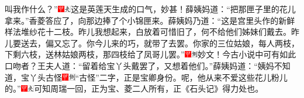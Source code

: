 叫我作什么？”{\includegraphics[width=3mm]{../Images/00002}\includegraphics[width=3mm]{../Images/00012}\footnotesize \kaishu 这是英莲天生成的口气，妙甚！}薛姨妈道：“把那匣子里的花儿拿来。”香菱答应了，向那边捧了个小锦匣来。薛姨妈乃道：“这是宫里头作的新鲜样法堆纱花十二枝。昨儿我想起来，白放着可惜旧了，何不给他们姊妹们戴去。昨儿要送去，偏又忘了。你今儿来的巧，就带了去罢。你家的三位姑娘，每人两枝，下剩六枝，送林姑娘两枝，那四枝给了凤哥儿罢。”{\includegraphics[width=3mm]{../Images/00002}\includegraphics[width=3mm]{../Images/00011}\footnotesize \kaishu 妙文！今古小说中可有如此口吻者？}王夫人道：“留着给宝丫头戴罢了，又想着他们。”薛姨妈道：“姨妈不知道，宝丫头古怪{\includegraphics[width=3mm]{../Images/00002}\includegraphics[width=3mm]{../Images/00011}\footnotesize \kaishu “古怪”二字，正是宝卿身份。}呢，他从来不爱这些花儿粉儿的。”{\includegraphics[width=3mm]{../Images/00002}\includegraphics[width=3mm]{../Images/00012}\footnotesize \kaishu 可知周瑞一回，正为宝、菱二人所有，正《石头记》得力处也。}

